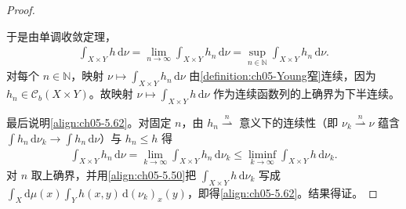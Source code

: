 \documentclass[../../main.tex]{subfiles}%
\begin{document}
\begin{proof}
\begin{enumerate}[(1)]
\end{enumerate}
于是由单调收敛定理，
\begin{align*}
\int_{X\times Y}h\,\mathrm{d}\nu
=\lim_{n\to\infty}\int_{X\times Y}h_n\,\mathrm{d}\nu
=\sup_{n\in\mathbb{N}}\int_{X\times Y}h_n\,\mathrm{d}\nu.
\end{align*}
对每个 $n\in\mathbb{N}$，映射 $\nu\mapsto\int_{X\times Y}h_n\,\mathrm{d}\nu$ 由\cref{definition:ch05-Young窄}连续，因为 $h_n\in\mathcal{C}_b(X\times Y)$。故映射 $\nu\mapsto\int_{X\times Y}h\,\mathrm{d}\nu$ 作为连续函数列的上确界为下半连续。

最后说明\eqref{align:ch05-5.62}。对固定 $n$，由 $h_n\stackrel{n}{\rightharpoonup}$ 意义下的连续性（即 $\nu_k\stackrel{n}{\rightharpoonup}\nu$ 蕴含 $\int h_n\,\mathrm{d}\nu_k\to\int h_n\,\mathrm{d}\nu$）与 $h_n\leqslant h$ 得
\begin{align*}
\int_{X\times Y}h_n\,\mathrm{d}\nu
=\lim_{k\to\infty}\int_{X\times Y}h_n\,\mathrm{d}\nu_k
\leqslant\liminf_{k\to\infty}\int_{X\times Y}h\,\mathrm{d}\nu_k.
\end{align*}
对 $n$ 取上确界，并用\eqref{align:ch05-5.50}把 $\int_{X\times Y}h\,\mathrm{d}\nu_k$ 写成 $\int_X\mathrm{d}\mu(x)\int_Yh(x,y)\,\mathrm{d}(\nu_k)_x(y)$，即得\eqref{align:ch05-5.62}。结果得证。
\end{proof}
\end{document}
